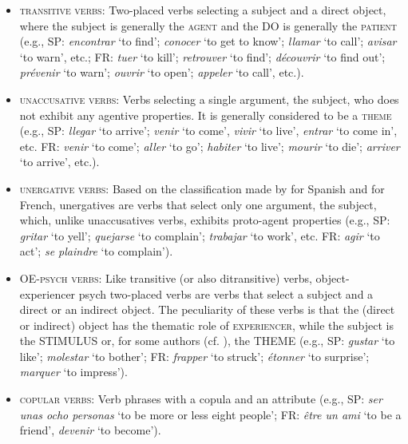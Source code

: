 \begin{itemize}
    \item \textsc{transitive verbs}: Two-placed verbs selecting a subject and a direct object, where the subject is generally the \textsc{agent} and the DO is generally the \textsc{patient} (e.g., SP: \textit{encontrar} `to find'; \textit{conocer} `to get to know'; \textit{llamar} `to call'; \textit{avisar} `to warn', etc.; FR: \textit{tuer} `to kill'; \textit{retrouver} `to find'; \textit{découvrir} `to find out'; \textit{prévenir} `to warn'; \textit{ouvrir} `to open'; \textit{appeler} `to call', etc.).
    \item \textsc{unaccusative verbs}: Verbs selecting a single argument, the subject, who does not exhibit any agentive properties. It is generally considered to be a \textsc{theme} (e.g., SP: \textit{llegar} `to arrive'; \textit{venir} `to come', \textit{vivir} `to live', \textit{entrar} `to come in', etc. FR: \textit{venir} `to come'; \textit{aller} `to go'; \textit{habiter} `to live'; \textit{mourir} `to die'; \textit{arriver} `to arrive', etc.).
    \item \textsc{unergative verbs}: Based on the classification made by \textcite{mendikoetxea1999construcciones} for Spanish and \textcite{legendre1989unaccusativity} for French, unergatives are verbs that select only one argument, the subject, which, unlike unaccusatives verbs, exhibits proto-agent properties (e.g., SP: \textit{gritar} `to yell'; \textit{quejarse} `to complain'; \textit{trabajar} `to work', etc. FR: \textit{agir} `to act'; \textit{se plaindre} `to complain').
    \item \textsc{OE-psych verbs}: Like transitive (or also ditransitive) verbs, object-experi\-enc\-er psych two-placed verbs are verbs that select a subject and a direct or an indirect object. The peculiarity of these verbs is that the (direct or indirect) object has the thematic role of \textsc{experiencer}, while the subject is the {\selectfont STIMULUS} or, for some authors (cf. \cite{gutierrez2013structural}), the {\selectfont THEME} (e.g., SP: \textit{gustar} `to like'; \textit{molestar} `to bother'; FR: \textit{frapper} `to struck'; \textit{étonner} `to surprise'; \textit{marquer} `to impress').
    \item \textsc{copular verbs}: Verb phrases with a copula and an attribute (e.g., SP: \textit{ser unas ocho personas} `to be more or less eight people'; FR: \textit{être un ami} `to be a friend', \textit{devenir} `to become').
\end{itemize}



